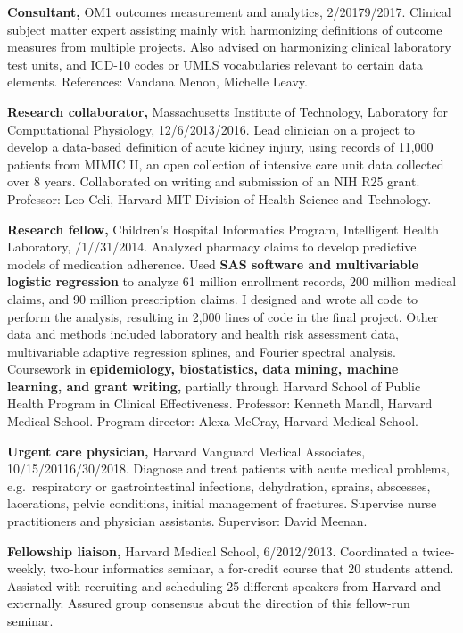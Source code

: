 \documentclass[10pt]{article}
\begin{document}
\textbf{Consultant,} OM1 outcomes measurement and analytics,
2/2017\ndash{}9/2017. Clinical subject matter expert assisting mainly
with harmonizing definitions of outcome measures from multiple
projects. Also advised on harmonizing clinical laboratory test units,
and ICD-10 codes or UMLS vocabularies relevant to certain data
elements. References: Vandana Menon, Michelle Leavy.

\textbf{Research collaborator,} Massachusetts Institute of Technology,
Laboratory for Computational Physiology,
12/6/2013\ndash{}/2016. Lead clinician on a project to
develop a data-based definition of acute kidney injury, using records
of 11,000 patients from MIMIC II, an open collection of intensive care
unit data collected over 8 years. Collaborated on writing and
submission of an NIH R25 grant. Professor: Leo Celi, Harvard-MIT
Division of Health Science and Technology.

\textbf{Research fellow,} Children's Hospital Informatics Program,
Intelligent Health Lab\-o\-ra\-to\-ry,
/1/\ndash{}/31/2014.
Analyzed pharmacy claims to develop predictive models of medication
adherence. Used \textbf{SAS software and multivariable logistic
  regression} to analyze 61 million enrollment records, 200 million
medical claims, and 90 million prescription claims. I designed and
wrote all code to perform the analysis, resulting in 2,000 lines of
code in the final project. Other data and methods included laboratory
and health risk assessment data, multivariable adaptive regression
splines, and Fourier spectral analysis. Coursework in
\textbf{epidemiology, biostatistics, data mining, machine learning,
  and grant writing,} partially through Harvard School of Public
Health Program in Clinical Effectiveness. Professor: Kenneth Mandl,
Harvard Medical School. Program director: Alexa McCray, Harvard
Medical School.

\textbf{Urgent care physician,} Harvard Vanguard Medical Associates,
10/15/2011\ndash{}6/30/2018. Diagnose and treat patients with acute
medical problems, e.g.\ respiratory or gastrointestinal infections,
dehydration, sprains, abscesses, lacerations, pelvic conditions,
initial management of fractures. Supervise nurse practitioners and
physician assistants. Supervisor: David Meenan.

\textbf{Fellowship liaison,} Harvard Medical School,
6/2012/2013. Coordinated a twice-week\-ly, two-hour informatics
seminar, a for-credit course that 20 students attend. Assisted with
recruiting and scheduling 25 different speakers from Harvard and
externally. Assured group consensus about the direction of this
fellow-run seminar.
\end{document}
